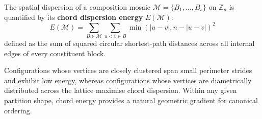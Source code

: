 The spatial dispersion of a composition mosaic $\mathcal{M} = \{B_1, \dots, B_s\}$ on $\mathbb{Z}_n$ is quantified by its \textbf{chord dispersion energy} $E(\mathcal{M})$:
\begin{equation}
E(\mathcal{M}) = \sum_{B \in \mathcal{M}} \sum_{u < v \in B} \min(|u - v|, n - |u - v|)^2
\end{equation}
defined as the sum of squared circular shortest-path distances across all internal edges of every constituent block. 

Configurations whose vertices are closely clustered span small perimeter strides and exhibit low energy, whereas configurations whose vertices are diametrically distributed across the lattice maximise chord dispersion. Within any given partition shape, chord energy provides a natural geometric gradient for canonical ordering.
